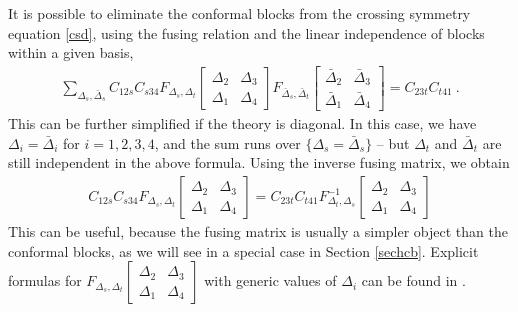\documentclass[12pt,a4paper,notitlepage]{report}
\numberwithin{equation}{section}
\theoremstyle{break}
\begin{document}
It is possible to eliminate the conformal blocks from the crossing symmetry equation \eqref{csd}, using the fusing relation and the linear independence of blocks within a given basis,
\begin{align}
 \sum_{\Delta_s,\bar{\Delta}_s} C_{12s} C_{s34}
F_{\Delta_s,\Delta_t}\begin{bmatrix} \Delta_2 & \Delta_3 \\ \Delta_1 & \Delta_4 \end{bmatrix}
F_{\bar{\Delta}_s,\bar{\Delta}_t}\begin{bmatrix} \bar{\Delta}_2 & \bar{\Delta}_3 \\ \bar{\Delta}_1 & \bar{\Delta}_4 \end{bmatrix}
=  C_{23t}C_{t41}\ .
\end{align}
This can be further simplified if the theory is diagonal.
In this case, we have $\Delta_i=\bar{\Delta}_i$ for $i=1,2,3,4$, and the sum runs over $\{\Delta_s=\bar{\Delta}_s\}$ -- but $\Delta_t$ and $\bar{\Delta}_t$ are still independent in the above formula.
Using the inverse fusing matrix, we obtain 
\begin{align}
 C_{12s} C_{s34}
F_{\Delta_s,\Delta_t}\begin{bmatrix} \Delta_2 & \Delta_3 \\ \Delta_1 & \Delta_4 \end{bmatrix}
= C_{23t}C_{t41} 
F^{-1}_{\Delta_t,\Delta_s}\begin{bmatrix} \Delta_2 & \Delta_3 \\ \Delta_1 & \Delta_4 \end{bmatrix}
\end{align}
This can be useful, because the fusing matrix is usually a simpler object than the conformal blocks, as we will see in a special case in Section \ref{sechcb}.
Explicit formulas for $F_{\Delta_s,\Delta_t}\begin{bmatrix} \Delta_2 & \Delta_3 \\ \Delta_1 & \Delta_4 \end{bmatrix}$ with generic values of $\Delta_i$ can be found in \cite{tv12}.
\end{document}
